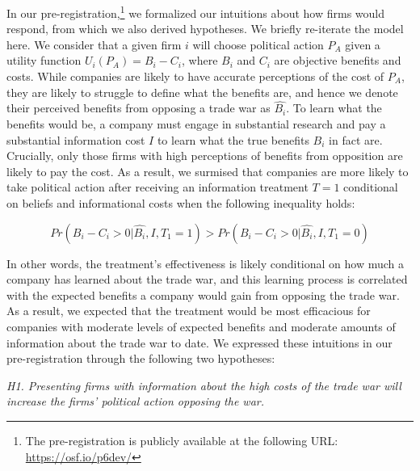 \documentclass{article}
\begin{document}
In our pre-registration,\footnote{The pre-registration is publicly available at the following URL: \url{https://osf.io/p6dev/}} we formalized our intuitions about how firms would respond, from which we also derived hypotheses. We briefly re-iterate the model here. We consider that a given firm $i$ will choose political action $P_A$ given a utility function $U_i(P_A) = B_i - C_i$, where $B_i$ and $C_i$ are objective benefits and costs. While companies are likely to have accurate perceptions of the cost of $P_A$, they are likely to struggle to define what the benefits are, and hence we denote their perceived benefits from opposing a trade war as $\hat{B_i}$. To learn what the benefits would be, a company must engage in substantial research and pay a substantial information cost $I$ to learn what the true benefits $B_i$ in fact are. Crucially, only those firms with high perceptions of benefits from opposition are likely to pay the cost. As a result, we surmised that companies are more likely to take political action after receiving an information treatment $T=1$ conditional on beliefs and informational costs when the following inequality holds:

\begin{equation}
Pr(B_i-C_i>0|\hat{B_i},I,T_1=1)>Pr(B_i-C_i>0|\hat{B_i},I,T_1=0)    
\end{equation}


In other words, the treatment's effectiveness is likely conditional on how much a company has learned about the trade war, and this learning process is correlated with the expected benefits a company would gain from opposing the trade war. As a result, we expected that the treatment would be most efficacious for companies with moderate levels of expected benefits and moderate amounts of information about the trade war to date. We expressed these intuitions in our pre-registration through the following two hypotheses:

\textit{H1. Presenting firms with information about the high costs of the trade war will increase the firms' political action opposing the war.}

\end{document}
